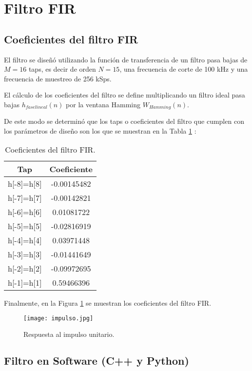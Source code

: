 \documentclass[12pt]{difu100cia} %
\begin{document}
\section{Filtro FIR}
\label{filtrofir}

\subsection{Coeficientes del filtro FIR}

El filtro se diseñó utilizando la función de transferencia de un filtro pasa bajas de $M=16$ taps, es decir de orden $N=15$, una frecuencia de corte de 100 kHz y una frecuencia de muestreo de 256 kSps. 

El cálculo de los coeficientes del filtro se define multiplicando un filtro ideal pasa bajas $h_{fase lineal}(n)$ por la ventana Hamming $W_{Hamming}(n)$. 

De este modo se determinó que los taps o coeficientes del filtro que cumplen con los parámetros de diseño son los que se muestran en la Tabla \ref{coeficientes} : 

\begin{table}[htb!]
\centering
\caption{Coeficientes del filtro FIR.} 
\begin{tabular}{cc} 
\toprule
 Tap   & Coeficiente \\ 
 \midrule
 h[-8]=h[8] & -0.00145482 \\ 
 h[-7]=h[7] & -0.00142821 \\ 
 h[-6]=h[6] & 0.01081722 \\ 
 h[-5]=h[5] & -0.02816919 \\ 
 h[-4]=h[4] & 0.03971448 \\ 
 h[-3]=h[3] & -0.01441649 \\ 
 h[-2]=h[2] & -0.09972695 \\
 h[-1]=h[1] & 0.59466396 \\
\bottomrule
\end{tabular}
\label{coeficientes}
\end{table}

Finalmente, en la Figura \ref{imp_unita} se muestran los coeficientes del filtro FIR.

\begin{figure}[!th]
	\centering
	\texttt{[image: impulso.jpg]}
	\caption{Respuesta al impulso unitario.}
	\label{imp_unita}
\end{figure}

\subsection{Filtro en Software (C++ y Python)}
\end{document}
